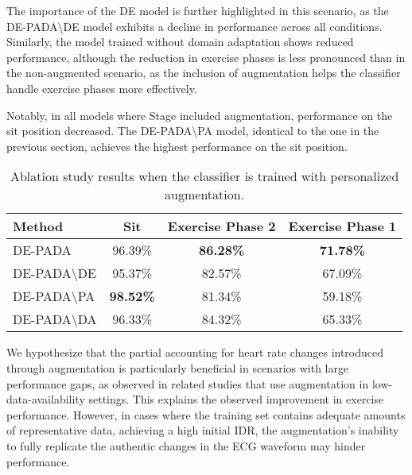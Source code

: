 The importance of the DE model is further highlighted in this scenario, as the DE-PADA\textbackslash DE model exhibits a decline in performance across all conditions.
Similarly, the model trained without domain adaptation shows reduced performance, although the reduction in exercise phases is less pronounced than in the non-augmented scenario, as the inclusion of augmentation helps the classifier handle exercise phases more effectively.

Notably, in all models where Stage \uppercase\expandafter{} included augmentation, performance on the sit position decreased. The DE-PADA\textbackslash PA model, identical to the one in the previous section, achieves the highest performance on the sit position.
\begin{table}[!t]
    \centering
    \caption{Ablation study results when the classifier is trained with personalized augmentation.}
    \label{tab:ablation_augmented}
    \begin{tabular}{lccc}
        \hline
        Method                   & Sit              & Exercise Phase 2  & Exercise Phase 1  \\
        \hline
        DE-PADA                  & 96.39\%          & \textbf{86.28\%} & \textbf{71.78\%} \\
        DE-PADA\textbackslash DE & 95.37\%          & 82.57\%          & 67.09\%          \\
        DE-PADA\textbackslash PA & \textbf{98.52\%} & 81.34\%          & 59.18\%          \\
        DE-PADA\textbackslash DA & 96.33\%          & 84.32\%          & 65.33\%          \\
        \hline
    \end{tabular}
\end{table}


We hypothesize that the partial accounting for heart rate changes introduced through augmentation is particularly beneficial in scenarios with large performance gaps, as observed in related studies that use augmentation in low-data-availability settings. This explains the observed improvement in exercise performance.
However, in cases where the training set contains adequate amounts of representative data, achieving a high initial IDR, the augmentation's inability to fully replicate the authentic changes in the ECG waveform may hinder performance.